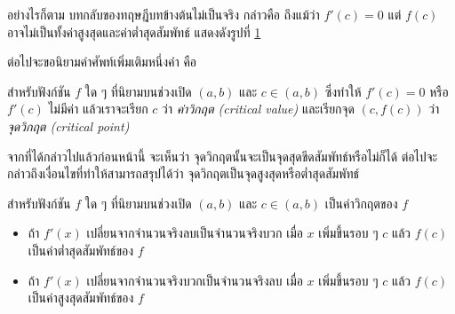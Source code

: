 \documentclass[hidelinks,12pt,a4paper]{article}
\begin{document}
อย่างไรก็ตาม บทกลับของทฤษฎีบทข้างต้นไม่เป็นจริง กล่าวคือ ถึงแม้ว่า $f'(c)=0$ แต่ $f(c)$ อาจไม่เป็นทั้งค่าสูงสุดและค่าต่ำสุดสัมพัทธ์ แสดงดังรูปที่ \ref{fig:1ordernessex}
\begin{figure}[h]
    \centering
    \caption{}
    \label{fig:1ordernessex}
\end{figure}
ต่อไปจะขอนิยามคำศัพท์เพิ่มเติมหนึ่งคำ คือ
\begin{tcolorbox}[title=\textbf{บทนิยาม: ค่าวิกฤต}]
    สำหรับฟังก์ชัน $f$ ใด ๆ ที่นิยามบนช่วงเปิด $(a,b)$ และ $c\in(a,b)$ ซึ่งทำให้ $f'(c)=0$ หรือ $f'(c)$ ไม่มีค่า แล้วเราจะเรียก $c$ ว่า \emph{ค่าวิกฤต (critical value)} และเรียกจุด $(c,f(c))$ ว่า \emph{จุดวิกฤต (critical point)} 
\end{tcolorbox}
\newpage
จากที่ได้กล่าวไปแล้วก่อนหน้านี้ จะเห็นว่า จุดวิกฤตนั้นจะเป็นจุดสุดขีดสัมพัทธ์หรือไม่ก็ได้ ต่อไปจะกล่าวถึงเงื่อนไขที่ทำให้สามารถสรุปได้ว่า จุดวิกฤตเป็นจุดสูงสุดหรือต่ำสุดสัมพัทธ์
\begin{tcolorbox}[title=\textbf{เงื่อนไขเพียงพอสำหรับอนุพันธ์อันดับ 1}]
    สำหรับฟังก์ชัน $f$ ใด ๆ ที่นิยามบนช่วงเปิด $(a,b)$ และ $c\in(a,b)$ เป็นค่าวิกฤตของ $f$ 
    \begin{itemize}
        \renewcommand{\labelitemi}{$*$}
        \item ถ้า $f'(x)$ เปลี่ยนจากจำนวนจริงลบเป็นจำนวนจริงบวก เมื่อ $x$ เพิ่มขึ้นรอบ ๆ $c$ แล้ว $f(c)$ เป็นค่าต่ำสุดสัมพัทธ์ของ $f$
        \item ถ้า $f'(x)$ เปลี่ยนจากจำนวนจริงบวกเป็นจำนวนจริงลบ เมื่อ $x$ เพิ่มขึ้นรอบ ๆ $c$ แล้ว $f(c)$ เป็นค่าสูงสุดสัมพัทธ์ของ $f$
    \end{itemize}
\end{tcolorbox}
\end{document}
